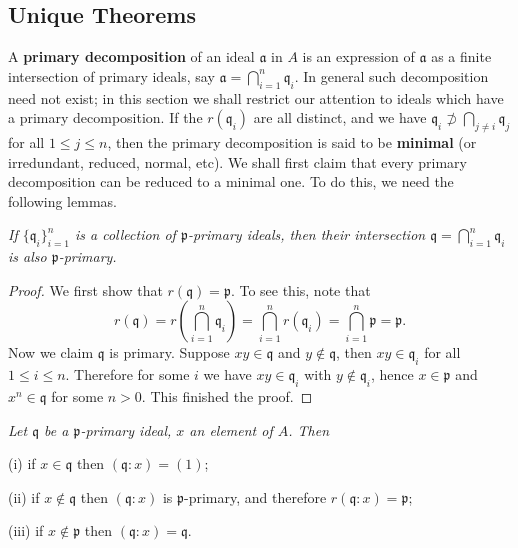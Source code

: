 \subsection{Unique Theorems}
A \textbf{primary decomposition} of an ideal $\mathfrak{a}$ in $A$ is an expression of $\mathfrak{a}$ as a finite intersection of primary ideals, say $\mathfrak{a}=\bigcap_{i=1}^n\mathfrak{q}_i$. In general such decomposition need not exist; in this section we shall restrict our attention to ideals which have a primary decomposition. If the $r(\mathfrak{q}_i)$ are all distinct, and we have $\mathfrak{q}_i\not\supset\bigcap_{j\ne i}\mathfrak{q}_j$ for all $1\le j\le n$, then the primary decomposition is said to be \textbf{minimal} (or irredundant, reduced, normal, etc). We shall first claim that every primary decomposition can be reduced to a minimal one. To do this, we need the following lemmas.
\begin{lemma}\em
If $\{\mathfrak{q}_i\}_{i=1}^n$ is a collection of $\mathfrak{p}$-primary ideals, then their intersection $\mathfrak{q}=\bigcap_{i=1}^n\mathfrak{q}_i$ is also $\mathfrak{p}$-primary.
\end{lemma}
\begin{proof}
We first show that $r(\mathfrak{q})=\mathfrak{p}$. To see this, note that 
$$
r\left( \mathfrak{q} \right) =r\left( \bigcap_{i=1}^n{\mathfrak{q} _i} \right) =\bigcap_{i=1}^n{r\left( \mathfrak{q} _i \right)}=\bigcap_{i=1}^n{\mathfrak{p}}=\mathfrak{p} .
$$
Now we claim $\mathfrak{q}$ is primary. Suppose $xy\in\mathfrak{q}$ and $y\notin\mathfrak{q}$, then $xy\in\mathfrak{q}_i$ for all $1\le i\le n$. Therefore for some $i$ we have $xy\in\mathfrak{q}_i$ with $y\notin\mathfrak{q}_i$, hence $x\in\mathfrak{p}$ and $x^n\in\mathfrak{q}$ for some $n>0$. This finished the proof.
\end{proof}
\begin{lemma}\em
Let $\mathfrak{q}$ be a $\mathfrak{p}$-primary ideal, $x$ an element of $A$. Then \par
(i) if $x\in\mathfrak{q}$ then $(\mathfrak{q}:x)=(1)$;\par
(ii) if $x\notin\mathfrak{q}$ then $(\mathfrak{q}:x)$ is $\mathfrak{p}$-primary, and therefore $r(\mathfrak{q}:x)=\mathfrak{p}$;\par
(iii) if $x\notin\mathfrak{p}$ then $(\mathfrak{q}:x)=\mathfrak{q}$.\par
\end{lemma}
